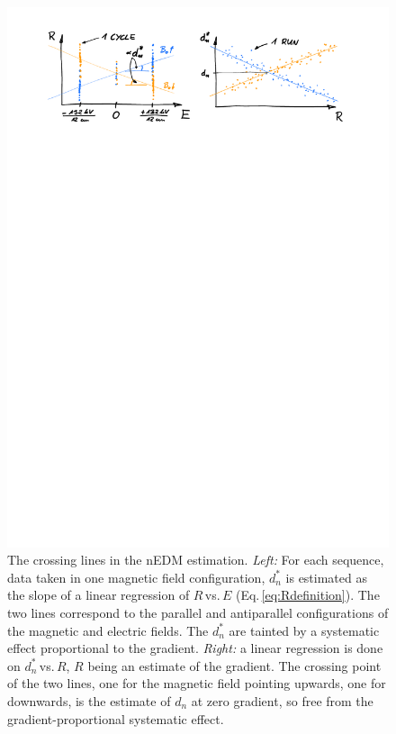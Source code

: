 \begin{figure}
  \centering
  \includegraphics[width=\linewidth]{gfx/nEDMatPSI/crossing_lines.pdf}
  \caption{The crossing lines in the nEDM estimation.
  \emph{Left:} For each sequence, data taken in one magnetic field configuration, $d_n^*$ is estimated as the slope of a linear regression of $R$\,vs.\,$E$ (Eq.\,\ref{eq:Rdefinition}).
  The two lines correspond to the parallel and antiparallel configurations of the magnetic and electric fields.
  The $d_n^*$ are tainted by a systematic effect proportional to the gradient.
  \emph{Right:} a linear regression is done on $d_n^*$\,vs.\,$R$, $R$ being an estimate of the gradient.
  The crossing point of the two lines, one for the magnetic field pointing upwards, one for downwards, is the estimate of $d_n$ at zero gradient, so free from the gradient-proportional systematic effect.}\label{fig:crossing_lines}
\end{figure}

